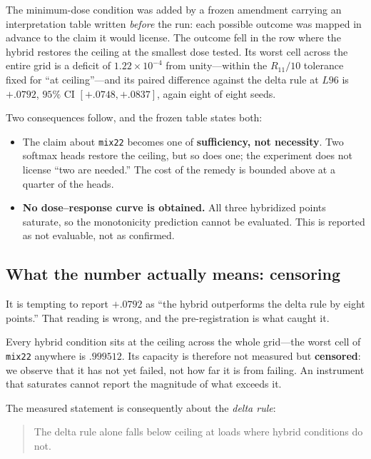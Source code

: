 \documentclass[jou,11pt,donotrepeattitle]{apa7}
\begin{document}
The minimum-dose condition was added by a frozen amendment carrying an interpretation table
written \emph{before} the run: each possible outcome was mapped in advance to the claim it
would license. The outcome fell in the row where the hybrid restores the ceiling at the
smallest dose tested. Its worst cell across the entire grid is a deficit of
$1.22\times10^{-4}$ from unity---within the $R_{11}/10$ tolerance fixed for ``at ceiling''---and
its paired difference against the delta rule at $L96$ is $+.0792$,
$95\%$ CI $[+.0748, +.0837]$, again eight of eight seeds.

Two consequences follow, and the frozen table states both:

\begin{itemize}
  \item The claim about \texttt{mix22} becomes one of \textbf{sufficiency, not necessity}. Two
        softmax heads restore the ceiling, but so does one; the experiment does not license
        ``two are needed.'' The cost of the remedy is bounded above at a quarter of the heads.
  \item \textbf{No dose--response curve is obtained.} All three hybridized points saturate, so
        the monotonicity prediction cannot be evaluated. This is reported as not evaluable, not
        as confirmed.
\end{itemize}

\subsection{What the number actually means: censoring}

It is tempting to report $+.0792$ as ``the hybrid outperforms the delta rule by eight points.''
That reading is wrong, and the pre-registration is what caught it.

Every hybrid condition sits at the ceiling across the whole grid---the worst cell of
\texttt{mix22} anywhere is $.999512$. Its capacity is therefore not measured but
\textbf{censored}: we observe that it has not yet failed, not how far it is from failing. An
instrument that saturates cannot report the magnitude of what exceeds it.

The measured statement is consequently about the \emph{delta rule}:

\begin{quote}
The delta rule alone falls below ceiling at loads where hybrid conditions do not.
\end{quote}
\end{document}
